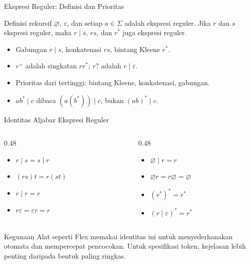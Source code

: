 \documentclass[aspectratio=169,10pt,t]{beamer}
\begin{document}
\begin{frame}{Ekspresi Reguler: Definisi dan Prioritas}
  \begin{block}{Definisi rekursif}
    \small
    \(\varnothing\), \(\varepsilon\), dan setiap \(a \in \Sigma\)
    adalah ekspresi reguler. Jika \(r\) dan \(s\) ekspresi reguler,
    maka \(r \mid s\), \(rs\), dan \(r^{*}\) juga ekspresi reguler.
  \end{block}

  \begin{itemize}
    \item Gabungan \(r \mid s\), konkatenasi \(rs\), bintang Kleene
          \(r^{*}\).
    \item \(r^{+}\) adalah singkatan \(rr^{*}\); \(r?\) adalah
          \(r \mid \varepsilon\).
    \item Prioritas dari tertinggi: bintang Kleene, konkatenasi,
          gabungan.
    \item \(ab^{*} \mid c\) dibaca \((a(b^{*})) \mid c\), bukan
          \((ab)^{*} \mid c\).
  \end{itemize}
\end{frame}

\begin{frame}{Identitas Aljabar Ekspresi Reguler}
  \small
  \begin{columns}[T,onlytextwidth]
    \begin{column}{0.48\textwidth}
      \begin{itemize}
        \item \(r \mid s = s \mid r\)
        \item \((rs)t = r(st)\)
        \item \(r \mid r = r\)
        \item \(r\varepsilon = \varepsilon r = r\)
      \end{itemize}
    \end{column}
    \begin{column}{0.48\textwidth}
      \begin{itemize}
        \item \(\varnothing \mid r = r\)
        \item \(\varnothing r = r\varnothing = \varnothing\)
        \item \((r^{*})^{*} = r^{*}\)
        \item \((r \mid \varepsilon)^{*} = r^{*}\)
      \end{itemize}
    \end{column}
  \end{columns}

  \vspace{5pt}
  \begin{block}{Kegunaan}
    \footnotesize
    Alat seperti Flex memakai identitas ini untuk menyederhanakan
    otomata dan mempercepat pencocokan. Untuk spesifikasi token,
    kejelasan lebih penting daripada bentuk paling ringkas.
  \end{block}
\end{frame}
\end{document}
